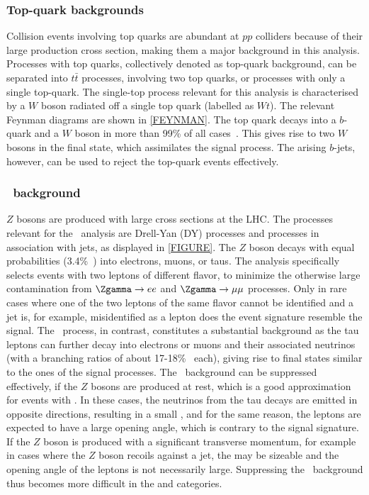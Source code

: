 \subsubsection{Top-quark backgrounds}
Collision events involving top quarks are abundant at $pp$ colliders because of their large production cross section, making them a major background in this analysis.
Processes with top quarks, collectively denoted as top-quark background, can be separated into $t\bar{t}$ processes, involving two top quarks, or processes with only a single top-quark. 
The single-top process relevant for this analysis is characterised by a $W$ boson radiated off a single top quark (labelled as $Wt$). 
The relevant Feynman diagrams are shown in \cref{FEYNMAN}.
The top quark decays into a $b$-quark and a $W$ boson in more than 99\% of all cases~\cite{PDG2020}. 
This gives rise to two $W$ bosons in the final state, which assimilates the signal process. The arising $b$-jets, however, can be used to reject the top-quark events effectively.


\subsubsection{\Ztautau\ background}
$Z$ bosons are produced with large cross sections at the LHC. The processes relevant for the \HWW\ analysis are Drell-Yan (DY) processes and \Zgamma processes in association with jets, as displayed in \cref{FIGURE}. 
The $Z$ boson decays with equal probabilities (3.4\%~\cite{PDG2020}) into electrons, muons, or taus. 
The analysis specifically selects events with two leptons of different flavor, to minimize the otherwise large contamination from $\Zgamma \to ee$ and $\Zgamma \to \mu\mu$ processes. Only in rare cases where one of the two leptons of the same flavor cannot be identified and a jet is, for example, misidentified as a lepton does the event signature resemble the signal. 
The \Ztautau\ process, in contrast, constitutes a substantial background as the tau leptons can further decay into electrons or muons and their associated neutrinos (with a branching ratios of about 17-18\%~\cite{PDG2020} each), giving rise to final states similar to the ones of the signal processes. 
The \Ztautau\ background can be suppressed effectively, if the $Z$ bosons are produced at rest, which is a good approximation for events with \ZeroJet. In these cases, the neutrinos from the tau decays are emitted in opposite directions, resulting in a small \MET, and for the same reason, the leptons are expected to have a large opening angle, which is contrary to the signal signature. 
If the $Z$ boson is produced with a significant transverse momentum, for example in cases where the $Z$ boson recoils against a jet, the \MET may be sizeable and the opening angle of the leptons is not necessarily large. 
Suppressing the \Ztautau\ background thus becomes more difficult in the \OneJet and \TwoJet categories. 



